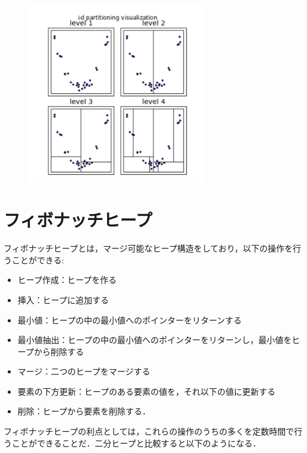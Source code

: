 \documentclass[
]{ltjarticle}
\begin{document}
\begin{figure}
\centering
\includegraphics[width=0.7\textwidth]{partition.jpg}
\end{figure}

\newpage

\hypertarget{ux30d5ux30a3ux30dcux30caux30c3ux30c1ux30d2ux30fcux30d7}{%
\section{フィボナッチヒープ}\label{ux30d5ux30a3ux30dcux30caux30c3ux30c1ux30d2ux30fcux30d7}}

フィボナッチヒープとは，マージ可能なヒープ構造をしており，以下の操作を行うことができる:

\begin{itemize}
\item ヒープ作成：ヒープを作る  
\item 挿入：ヒープに追加する  
\item 最小値：ヒープの中の最小値へのポインターをリターンする  
\item 最小値抽出：ヒープの中の最小値へのポインターをリターンし，最小値をヒープから削除する  
\item マージ：二つのヒープをマージする  
\item 要素の下方更新：ヒープのある要素の値を，それ以下の値に更新する  
\item 削除：ヒープから要素を削除する． 
\end{itemize}

フィボナッチヒープの利点としては，これらの操作のうちの多くを定数時間で行うことができることだ．二分ヒープと比較すると以下のようになる．
\end{document}
